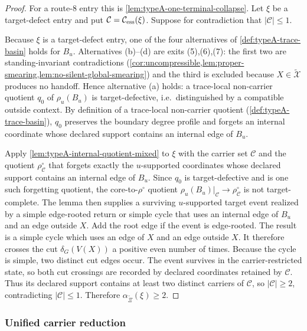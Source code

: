 \documentclass[11pt]{article}
\begin{document}
\begin{proof}
For a route-8 entry this is \cref{lem:typeA-one-terminal-collapse}.  Let $\xi$ be a target-defect entry and
put $\mathcal C=\mathcal C_{\rm ess}(\xi)$.  Suppose
for contradiction that $|\mathcal C|\le1$.

Because $\xi$ is a target-defect entry, one of the four alternatives of
\cref{def:typeA-trace-basin} holds for $B_u$.  Alternatives (b)--(d) are exits
(5),(6),(7): the first two are standing-invariant contradictions
(\cref{cor:uncompressible,lem:proper-smearing,lem:no-silent-global-smearing})
and the third is excluded because $X\in\tilde{\mathcal X}$ produces no handoff.
Hence alternative (a) holds: a trace-local non-carrier quotient
$q_0$ of $\rho_u(B_u)$ is target-defective, i.e.\ distinguished by a compatible
outside context.  By definition of a trace-local non-carrier quotient
(\cref{def:typeA-trace-basin}), $q_0$ preserves the boundary degree profile and
forgets an internal coordinate whose declared support contains an internal edge
of $B_u$.

Apply \cref{lem:typeA-internal-quotient-mixed} to $\xi$ with the carrier set
$\mathcal C$ and the quotient $\rho_{\mathcal C}^\circ$ that forgets exactly the
$u$-supported coordinates whose declared support contains an internal edge of
$B_u$.  Since $q_0$ is target-defective and is one such forgetting quotient, the
core-to-$\rho^\circ$ quotient
$\rho_u(B_u)|_{\mathcal C}\to\rho_{\mathcal C}^\circ$ is not target-complete.
The lemma then supplies a surviving $u$-supported target event realized by a
simple edge-rooted return or simple cycle that uses an internal edge of $B_u$
and an edge outside $X$.  Add the root edge if the event is edge-rooted.  The
result is a simple cycle which uses an edge of \(X\) and an edge outside \(X\).
It therefore crosses the cut \(\delta_G(V(X))\) a positive even number of
times.  Because the cycle is simple, two distinct cut edges occur.  The event
survives in the carrier-restricted state, so both cut crossings are recorded by
declared coordinates retained by \(\mathcal C\).  Thus its declared support
contains at least two distinct carriers of \(\mathcal C\), so
\(|\mathcal C|\ge2\), contradicting \(|\mathcal C|\le1\).  Therefore
\(\alpha_{\tilde\Xi}(\xi)\ge2\).
\end{proof}

\subsubsection{Unified carrier reduction}
\end{document}
